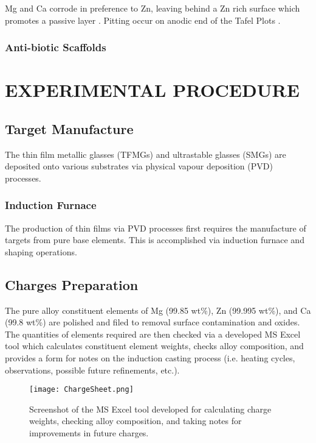 \documentclass[draft,a4paper,12pt,oneside]{report}%
\begin{document}
Mg and Ca corrode in preference to Zn, leaving behind a Zn rich surface which promotes a passive layer \cite{Wang2012}.
Pitting occur on anodic end of the Tafel Plots \cite{Schluter2012}.

\subsection{Anti-biotic Scaffolds}

\chapter{EXPERIMENTAL PROCEDURE}
\glsresetall

\section{Target Manufacture}
The thin film metallic glasses (TFMGs) and ultrastable glasses (SMGs) are deposited onto various substrates via physical vapour deposition (PVD) processes.

\subsection{Induction Furnace} 
The production of thin films via PVD processes first requires the manufacture of targets from pure base elements. This is accomplished via induction furnace and shaping operations. 

\section{Charges Preparation}
The pure alloy constituent elements of Mg (99.85 wt\%), Zn (99.995 wt\%), and Ca (99.8 wt\%) are polished and filed to removal surface contamination and oxides. The quantities of elements required are then checked via a developed MS Excel tool which calculates constituent element weights, checks alloy composition, and provides a form for notes on the induction casting process (i.e. heating cycles, observations, possible future refinements, etc.).

\begin{figure}[htbp]
	\centering
	\texttt{[image: ChargeSheet.png]}
	\caption[Charge Calculation Programme]{Screenshot of the MS Excel tool developed for calculating charge weights, checking alloy composition, and taking notes for improvements in future charges.}
	\label{fig:ChargeSheet}
\end{figure}
\end{document}
